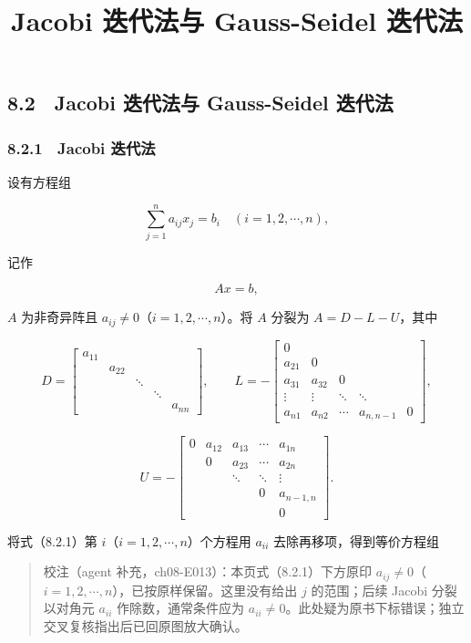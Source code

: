 \documentclass[
  10pt,
  fontset=fandol]{ctexart}
\title{Jacobi 迭代法与 Gauss-Seidel 迭代法}
\author{}
\date{}
\begin{document}
\maketitle

\subsection{8.2　Jacobi 迭代法与 Gauss-Seidel 迭代法}\label{jacobi-ux8fedux4ee3ux6cd5ux4e0e-gauss-seidel-ux8fedux4ee3ux6cd5}

\subsubsection{8.2.1　Jacobi 迭代法}\label{jacobi-ux8fedux4ee3ux6cd5}

设有方程组

\[
\sum_{j=1}^n a_{ij}x_j=b_i\quad(i=1,2,\cdots,n),
\]

记作

\[
Ax=b,
\tag{8.2.1}
\]

\(A\) 为非奇异阵且 \(a_{ij}\neq0\)（\(i=1,2,\cdots,n\)）。将 \(A\) 分裂为 \(A=D-L-U\)，其中

\[
D=\begin{bmatrix}
a_{11}&&&&\\
&a_{22}&&&\\
&&\ddots&&\\
&&&\ddots&\\
&&&&a_{nn}
\end{bmatrix},\qquad
L=-\begin{bmatrix}
0&&&&\\
a_{21}&0&&&\\
a_{31}&a_{32}&0&&\\
\vdots&\vdots&\ddots&\ddots&\\
a_{n1}&a_{n2}&\cdots&a_{n,n-1}&0
\end{bmatrix},
\]

\[
U=-\begin{bmatrix}
0&a_{12}&a_{13}&\cdots&a_{1n}\\
&0&a_{23}&\cdots&a_{2n}\\
&&\ddots&\ddots&\vdots\\
&&&0&a_{n-1,n}\\
&&&&0
\end{bmatrix}.
\]

将式（8.2.1）第 \(i\)（\(i=1,2,\cdots,n\)）个方程用 \(a_{ii}\) 去除再移项，得到等价方程组

\begin{quote}
校注（agent 补充，ch08-E013）：本页式（8.2.1）下方原印 \(a_{ij}\neq0\)（\(i=1,2,\cdots,n\)），已按原样保留。这里没有给出 \(j\) 的范围；后续 Jacobi 分裂以对角元 \(a_{ii}\) 作除数，通常条件应为 \(a_{ii}\neq0\)。此处疑为原书下标错误；独立交叉复核指出后已回原图放大确认。
\end{quote}
\end{document}
